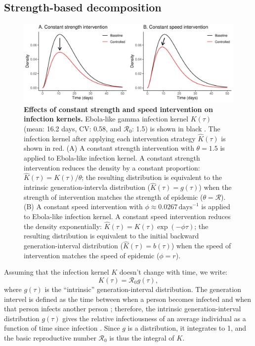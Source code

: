 \documentclass[12pt]{article}
\newcommand{\RR}{\ensuremath{{\mathcal R}}}
\newcommand{\figlab}[1]{\label{fig:#1}}
\newcommand{\eqlab}[1]{\label{eq:#1}}
\begin{document}
\subsection{Strength-based decomposition}

\begin{figure}[!t]
\includegraphics[width=\textwidth]{../figure/constant_intervention.pdf}
\caption{
\textbf{Effects of constant strength and speed intervention on infection kernels.}
Ebola-like gamma infection kernel $K(\tau)$ (mean: 16.2 days, CV: 0.58, and $\RR_0$: 1.5) is shown in black \citep{park2019practical}.
The infection kernel after applying each intervention strategy $\hat K(\tau)$ is shown in red.
(A) A constant strength intervention with $\theta = 1.5$ is applied to Ebola-like infection kernel.
A constant strength intervention reduces the density by a constant proportion: $\hat K(\tau) = K(\tau)/\theta$; the resulting distribution is equivalent to the intrinsic generation-intervla distribution ($\hat K(\tau) = g(\tau)$) when the strength of intervention matches the strength of epidemic ($\theta = \mathcal R$).
(B) A constant speed intervention with $\phi \approx 0.0267\,\mathrm{days}^{-1}$ is applied to Ebola-like infection kernel.
A constant speed intervention reduces the density exponentially: $\hat K(\tau) = K(\tau) \exp(-\phi \tau)$; the resulting distribution is equivalent to the initial backward generation-interval distribution ($\hat K(\tau) = b(\tau)$) when the speed of intervention matches the speed of epidemic ($\phi = r$).
}
\figlab{constant}
\end{figure}

Assuming that the infection kernel $K$ doesn't change with time, we write:
\begin{equation}
	K(\tau) = \RR_0 g(\tau),
	\eqlab{strength}
\end{equation}
where $g(\tau)$ is the ``intrinsic'' generation-interval distribution.
The generation intervel is defined as the time between when a person becomes infected and when that person infects another person \citep{svensson2007note};
therefore, the intrinsic generation-interval distribution $g(\tau)$ gives the relative infectiousness of an average individual as a function of time since infection \citep{champredon2015intrinsic}. 
Since $g$ is a distribution, it integrates to 1, and the basic reproductive number $\RR_0$ is thus the integral of $K$.
\end{document}
